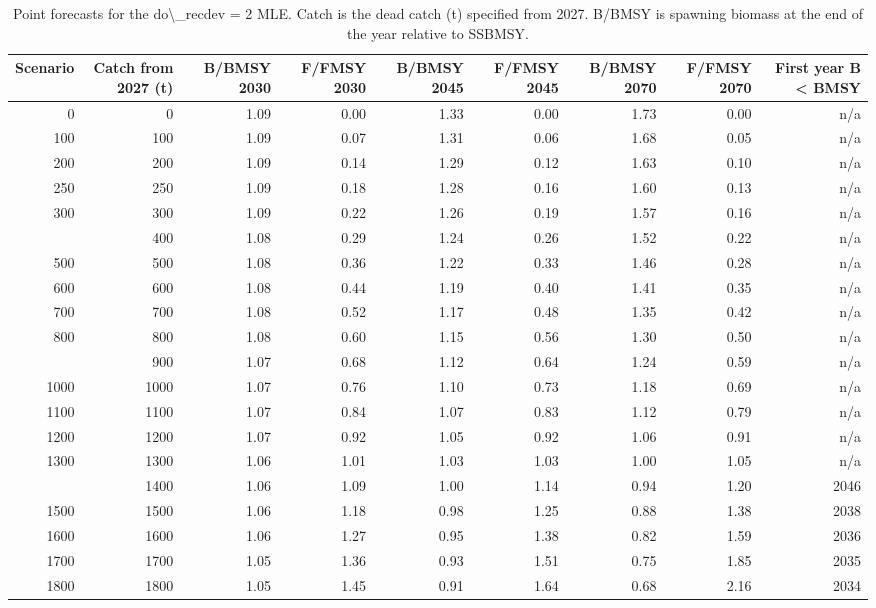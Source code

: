 \begin{table}[htbp]

\caption{\label{tab:recdev2}Point forecasts for the do\textbackslash{}\_recdev = 2 MLE. Catch is the dead catch (t) specified from 2027. B/BMSY is spawning biomass at the end of the year relative to SSBMSY.}
\centering
\begin{tabular}[t]{rrrrrrrrr}
\toprule
Scenario & Catch from 2027 (t) & B/BMSY 2030 & F/FMSY 2030 & B/BMSY 2045 & F/FMSY 2045 & B/BMSY 2070 & F/FMSY 2070 & First year B < BMSY\\
\midrule
0 & 0 & 1.09 & 0.00 & 1.33 & 0.00 & 1.73 & 0.00 & n/a\\
100 & 100 & 1.09 & 0.07 & 1.31 & 0.06 & 1.68 & 0.05 & n/a\\
200 & 200 & 1.09 & 0.14 & 1.29 & 0.12 & 1.63 & 0.10 & n/a\\
250 & 250 & 1.09 & 0.18 & 1.28 & 0.16 & 1.60 & 0.13 & n/a\\
300 & 300 & 1.09 & 0.22 & 1.26 & 0.19 & 1.57 & 0.16 & n/a\\
\addlinespace
400 & 400 & 1.08 & 0.29 & 1.24 & 0.26 & 1.52 & 0.22 & n/a\\
500 & 500 & 1.08 & 0.36 & 1.22 & 0.33 & 1.46 & 0.28 & n/a\\
600 & 600 & 1.08 & 0.44 & 1.19 & 0.40 & 1.41 & 0.35 & n/a\\
700 & 700 & 1.08 & 0.52 & 1.17 & 0.48 & 1.35 & 0.42 & n/a\\
800 & 800 & 1.08 & 0.60 & 1.15 & 0.56 & 1.30 & 0.50 & n/a\\
\addlinespace
900 & 900 & 1.07 & 0.68 & 1.12 & 0.64 & 1.24 & 0.59 & n/a\\
1000 & 1000 & 1.07 & 0.76 & 1.10 & 0.73 & 1.18 & 0.69 & n/a\\
1100 & 1100 & 1.07 & 0.84 & 1.07 & 0.83 & 1.12 & 0.79 & n/a\\
1200 & 1200 & 1.07 & 0.92 & 1.05 & 0.92 & 1.06 & 0.91 & n/a\\
1300 & 1300 & 1.06 & 1.01 & 1.03 & 1.03 & 1.00 & 1.05 & n/a\\
\addlinespace
1400 & 1400 & 1.06 & 1.09 & 1.00 & 1.14 & 0.94 & 1.20 & 2046\\
1500 & 1500 & 1.06 & 1.18 & 0.98 & 1.25 & 0.88 & 1.38 & 2038\\
1600 & 1600 & 1.06 & 1.27 & 0.95 & 1.38 & 0.82 & 1.59 & 2036\\
1700 & 1700 & 1.05 & 1.36 & 0.93 & 1.51 & 0.75 & 1.85 & 2035\\
1800 & 1800 & 1.05 & 1.45 & 0.91 & 1.64 & 0.68 & 2.16 & 2034\\

\end{tabular}
\end{table}
